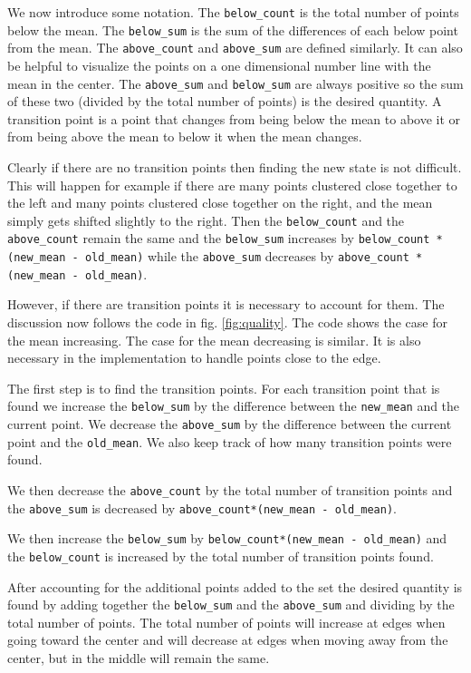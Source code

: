 \documentclass[twocolumn]{article}
\begin{document}
We now introduce some notation. The \texttt{below\_count} is the total number
of points below the mean. The \texttt{below\_sum} is the sum of the
differences of each below point from the mean. The \texttt{above\_count} and
\texttt{above\_sum} are defined similarly. It can also be helpful to visualize
the points on a one dimensional number line with the mean in the center. The
\texttt{above\_sum} and \texttt{below\_sum} are always positive so the sum of
these two (divided by the total number of points) is the desired quantity. A
transition point is a point that changes from being below the mean to above it
or from being above the mean to below it when the mean changes.

Clearly if there are no transition points then finding the new state
is not difficult. This will happen for example if there are many
points clustered close together to the left and many points clustered
close together on the right, and the mean simply gets shifted slightly
to the right. Then the \texttt{below\_count} and the
\texttt{above\_count} remain the same and the \texttt{below\_sum}
increases by \texttt{below\_count * (new\_mean - old\_mean)} while the
\texttt{above\_sum} decreases by \texttt{above\_count * (new\_mean - old\_mean)}.

However, if there are transition points it is necessary to account for
them. The discussion now follows the code in fig. \ref{fig:quality}. The
code shows the case for the mean increasing. The case for the mean
decreasing is similar. It is also necessary in the implementation to
handle points close to the edge.


The first step is to find the transition points. For each transition
point that is found we increase the \texttt{below\_sum} by the
difference between the \texttt{new\_mean} and the current point. We
decrease the \texttt{above\_sum} by the difference between the current
point and the \texttt{old\_mean}. We also keep track of how many
transition points were found.

We then decrease the \texttt{above\_count} by the total number of
transition points and the \texttt{above\_sum} is decreased by
\texttt{above\_count*(new\_mean - old\_mean)}. 

We then increase the \texttt{below\_sum} by
\texttt{below\_count*(new\_mean - old\_mean)} and the
\texttt{below\_count} is increased by the total number of transition
points found.

After accounting for the additional points added to the set
the desired quantity is found by adding together the \texttt{below\_sum}
and the \texttt{above\_sum} and dividing by the total number of
points. The total number of points will increase at edges when
going toward the center and will decrease at edges when moving
away from the center, but in the middle will remain the same. 
\end{document}
